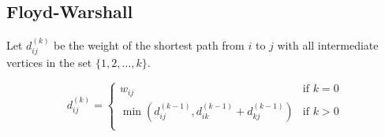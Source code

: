\documentclass{article}
\begin{document}
\begin{multicols*}{2}
\begin{multicols*}{2}
    \end{multicols*}
    \columnbreak
    \subsection*{Floyd-Warshall}
    Let \(d_{ij}^{(k)}\) be the weight of the shortest path from \(i\) to \(j\)
    with all intermediate vertices in the set \(\{1, 2, \ldots, k\}\).

    \begin{equation*}
        d_{ij}^{(k)} = \begin{cases}
            w_{ij}                                                & \text{if } k = 0 \\
            \min(d_{ij}^{(k-1)}, d_{ik}^{(k-1)} + d_{kj}^{(k-1)}) & \text{if } k > 0 \\
        \end{cases}
    \end{equation*}


\end{multicols*}
\end{document}
